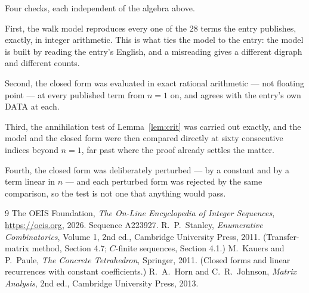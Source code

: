 \documentclass[11pt,a4paper]{article}
\theoremstyle{plain}
\theoremstyle{definition}
\begin{document}
Four checks, each independent of the algebra above.

First, the walk model reproduces every one of the $28$ terms the entry publishes,
exactly, in integer arithmetic. This is what ties the model to the entry: the model is built
by reading the entry's English, and a misreading gives a different digraph and different
counts.

Second, the closed form was evaluated in exact rational arithmetic --- not floating point ---
at every published term from $n=1$ on, and agrees with the entry's own DATA at each.

Third, the annihilation test of Lemma~\ref{lem:crit} was carried out exactly, and the model
and the closed form were then compared directly at sixty consecutive indices beyond
$n=1$, far past where the proof already settles the matter.

Fourth, the closed form was deliberately perturbed --- by a constant and by a term linear in
$n$ --- and each perturbed form was rejected by the same comparison, so the test is not one
that anything would pass.

\begin{thebibliography}{9}
 The OEIS Foundation, \emph{The On-Line Encyclopedia of Integer
Sequences}, \url{https://oeis.org}, 2026. Sequence A223927.
 R.~P.~Stanley, \emph{Enumerative Combinatorics}, Volume 1, 2nd ed.,
Cambridge University Press, 2011. (Transfer-matrix method, Section 4.7; $C$-finite sequences,
Section 4.1.)
 M.~Kauers and P.~Paule, \emph{The Concrete Tetrahedron}, Springer, 2011.
(Closed forms and linear recurrences with constant coefficients.)
 R.~A.~Horn and C.~R.~Johnson, \emph{Matrix Analysis}, 2nd ed., Cambridge
University Press, 2013.
\end{thebibliography}
\end{document}
